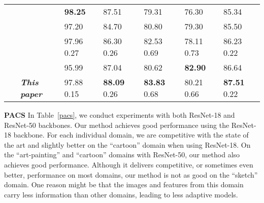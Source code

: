 \documentclass{article} \usepackage[table]{xcolor}
\begin{document}
\begin{table}[t]
{\begin{tabular}{lllllll}
~   & \cite{zhao2020domain} & \textbf{98.25} & 87.51 & 79.31 & 76.30 & 85.34 \\
~ & \cite{gulrajani2020search}  & 97.20 & 84.70 & 80.80 & 79.30 & 85.50 \\
~ & \cite{wang2021tent}{}  & 97.96 \scriptsize{0.27} & 86.30 \scriptsize{0.26} & 82.53 \scriptsize{0.69} & 78.11 \scriptsize{0.73} & 86.23 \scriptsize{0.22} \\
~   & \cite{seo2020learning} & 95.99 & 87.04 & 80.62 & \textbf{82.90} & 86.64 \\
~   & \textit{\textbf{This paper}}  & 97.88 \scriptsize{0.15}         & \textbf{88.09} \scriptsize{0.26}  & \textbf{83.83} \scriptsize{0.68} & 80.21 \scriptsize{0.66}         & \textbf{87.51} \scriptsize{0.22} \\ 
\bottomrule
\end{tabular}
}
\vspace{-3mm}
\end{table}
\textbf{PACS} In Table~\ref{pacs}, we conduct experiments with both ResNet-18 and ResNet-50 backbones.
Our method achieves good performance using the ResNet-18 backbone.
For each individual domain, we are competitive with the state of the art and slightly better on the ``cartoon'' domain when using ResNet-18. 
On the ``art-painting'' and ``cartoon'' domains with ResNet-50, our method also achieves good performance. Although it delivers competitive, or sometimes even better, performance on most domains, our method is not as good on the ``sketch'' domain. One reason might be that the images and features from this domain carry less information than other domains, leading to less adaptive models.
\end{document}
